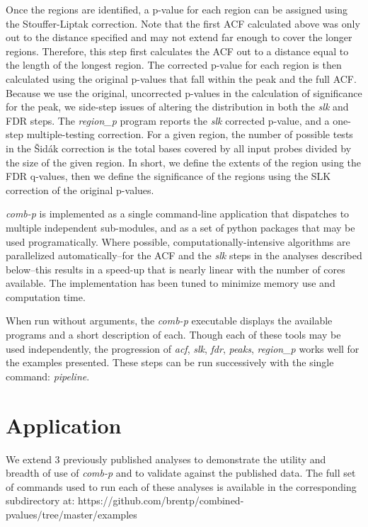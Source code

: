 \documentclass{bioinfo}
\begin{document}
\begin{methods}
Once the regions are identified, a p-value for each region can be assigned
using the Stouffer-Liptak correction.
Note that the first ACF calculated
above was only out to the distance specified and may not extend far enough
to cover the longer regions.
Therefore, this step first calculates the ACF out to a distance equal
to the length of the longest region. The corrected
p-value for each region is then calculated using the original p-values
that fall within the peak and the full ACF.
Because we use the original,
uncorrected p-values in the calculation of significance for the peak,
we side-step issues of altering the distribution in both the
\textit{slk} and FDR steps. The \textit{region\_p} program reports the
\textit{slk} corrected p-value, and a one-step \cite{Sidak}
multiple-testing correction.
For a given region, the number of possible tests
in the \v{S}id\'{a}k correction is the total bases covered by all input probes
divided by the size of the given region.
In short, we define the extents of the region using the FDR q-values,
then we define the significance of the regions using the SLK correction
of the original p-values.

\textit{comb-p} is implemented as a single command-line application that
dispatches to multiple independent sub-modules, and as a set of python
packages that may be used programatically. Where possible,
computationally-intensive algorithms are parallelized
automatically--for the ACF and the \textit{slk} steps in the analyses
described below--this
results in a speed-up that is nearly linear with the number of cores available.
The implementation has been tuned to minimize memory use and
computation time.

When run without arguments, the \textit{comb-p} executable displays the
available programs and a short description of each.
Though each of these tools may be used independently, the progression of
\textit{acf}, \textit{slk}, \textit{fdr}, \textit{peaks}, \textit{region\_p}
works well for the examples presented. These steps can
be run successively with the single command: \textit{pipeline}.

\section{Application}
We extend 3 previously published analyses to demonstrate the utility and
breadth of use of \textit{comb-p} and to validate against the
published data. The full set of commands used to run each of these analyses
is available in the corresponding subdirectory at:
https://github.com/brentp/combined-pvalues/tree/master/examples


\end{methods}
\end{document}
